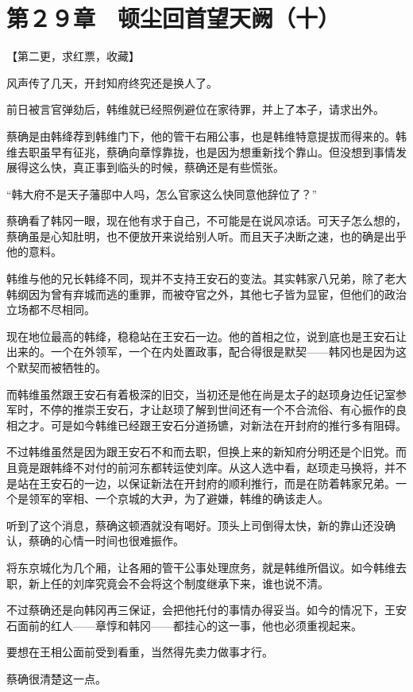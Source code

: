 \section{第２９章　顿尘回首望天阙（十）}

【第二更，求红票，收藏】

风声传了几天，开封知府终究还是换人了。

前日被言官弹劾后，韩维就已经照例避位在家待罪，并上了本子，请求出外。

蔡确是由韩绛荐到韩维门下，他的管干右厢公事，也是韩维特意提拔而得来的。韩维去职虽早有征兆，蔡确向章惇靠拢，也是因为想重新找个靠山。但没想到事情发展得这么快，真正事到临头的时候，蔡确还是有些慌张。

“韩大府不是天子藩邸中人吗，怎么官家这么快同意他辞位了？”

蔡确看了韩冈一眼，现在他有求于自己，不可能是在说风凉话。可天子怎么想的，蔡确虽是心知肚明，也不便放开来说给别人听。而且天子决断之速，也的确是出乎他的意料。

韩维与他的兄长韩绛不同，现并不支持王安石的变法。其实韩家八兄弟，除了老大韩纲因为曾有弃城而逃的重罪，而被夺官之外，其他七子皆为显宦，但他们的政治立场都不尽相同。

现在地位最高的韩绛，稳稳站在王安石一边。他的首相之位，说到底也是王安石让出来的。一个在外领军，一个在内处置政事，配合得很是默契——韩冈也是因为这个默契而被牺牲的。

而韩维虽然跟王安石有着极深的旧交，当初还是他在尚是太子的赵顼身边任记室参军时，不停的推崇王安石，才让赵顼了解到世间还有一个不合流俗、有心振作的良相之才。可是如今韩维已经跟王安石分道扬镳，对新法在开封府的推行多有阻碍。

不过韩维虽然是因为跟王安石不和而去职，但换上来的新知府分明还是个旧党。而且竟是跟韩绛不对付的前河东都转运使刘庠。从这人选中看，赵顼走马换将，并不是站在王安石的一边，以保证新法在开封府的顺利推行，而是在防着韩家兄弟。一个是领军的宰相、一个京城的大尹，为了避嫌，韩维的确该走人。

听到了这个消息，蔡确这顿酒就没有喝好。顶头上司倒得太快，新的靠山还没确认，蔡确的心情一时间也很难振作。

将东京城化为几个厢，让各厢的管干公事处理庶务，就是韩维所倡议。如今韩维去职，新上任的刘庠究竟会不会将这个制度继承下来，谁也说不清。

不过蔡确还是向韩冈再三保证，会把他托付的事情办得妥当。如今的情况下，王安石面前的红人——章惇和韩冈——都挂心的这一事，他也必须重视起来。

要想在王相公面前受到看重，当然得先卖力做事才行。

蔡确很清楚这一点。

